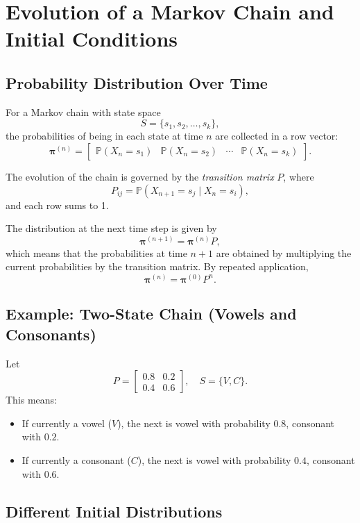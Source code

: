 \section*{Evolution of a Markov Chain and Initial Conditions}

\subsection*{Probability Distribution Over Time}

For a Markov chain with state space 
\[
S = \{s_1, s_2, \dots, s_k\},
\]
the probabilities of being in each state at time $n$ are collected in a row vector:
\[
\boldsymbol{\pi}^{(n)} =
\begin{bmatrix}
\mathbb{P}(X_n = s_1) &
\mathbb{P}(X_n = s_2) &
\cdots &
\mathbb{P}(X_n = s_k)
\end{bmatrix}.
\]

The evolution of the chain is governed by the \emph{transition matrix} $P$, where
\[
P_{ij} = \mathbb{P}(X_{n+1} = s_j \mid X_n = s_i),
\]
and each row sums to 1.  

The distribution at the next time step is given by
\[
\boldsymbol{\pi}^{(n+1)} = \boldsymbol{\pi}^{(n)} P,
\]
which means that the probabilities at time $n+1$ are obtained by multiplying
the current probabilities by the transition matrix.  
By repeated application,
\[
\boldsymbol{\pi}^{(n)} = \boldsymbol{\pi}^{(0)} P^n.
\]

\subsection*{Example: Two-State Chain (Vowels and Consonants)}

Let
\[
P =
\begin{bmatrix}
0.8 & 0.2 \\
0.4 & 0.6
\end{bmatrix},
\quad S = \{V, C\}.
\]
This means:
\begin{itemize}
    \item If currently a vowel ($V$), the next is vowel with probability $0.8$, consonant with $0.2$.
    \item If currently a consonant ($C$), the next is vowel with probability $0.4$, consonant with $0.6$.
\end{itemize}

\subsection*{Different Initial Distributions}

